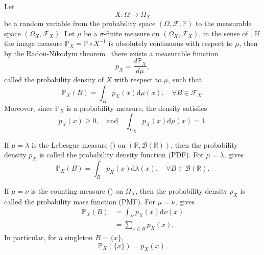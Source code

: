 \begin{definition}
	\label{def:prob_density_general}
	Let
	\begin{equation}
		X\colon \Omega \to \Omega_X
	\end{equation}
	be a random variable from the probability space $(\Omega, \mathcal{F}, \mathbb{P})$ to the measurable space $(\Omega_X, \mathcal{F}_X)$. Let $\mu$ be a $\sigma$-finite measure on $(\Omega_X, \mathcal{F}_X)$, in the sense of . If the image measure $\mathbb{P}_X = \mathbb{P} \circ X^{-1}$ is absolutely continuous with respect to $\mu$, then by the Radon-Nikodym theorem~\cite{Navratil1981} there exists a measurable function
	\begin{equation}
		p_X = \frac{d\mathbb{P}_X}{d\mu},
	\end{equation}
	called the probability density of $X$ with respect to $\mu$, such that
	\begin{equation}
		\mathbb{P}_X(B) = \int_B p_X(x) \mathrm{d}\mu(x), \quad \forall B \in \mathcal{F}_X.
	\end{equation}
	Moreover, since $\mathbb{P}_X$ is a probability measure, the density satisfies
	\begin{equation}
		p_X(x) \ge 0, \quad \text{and} \quad
		\int_{\Omega_X} p_X(x) \mathrm{d}\mu(x) = 1.
	\end{equation}
\end{definition}

\begin{remark}
	\label{remark:pdf}
	If $\mu = \lambda$ is the Lebesgue measure () on $(\mathbb{R}, \mathcal{B}(\mathbb{R}))$, then the probability density $p_X$ is called the probability density function (PDF). For $\mu = \lambda$,  gives
	\begin{equation}
		\mathbb{P}_X(B) = \int_B p_X(x) \mathrm{d}\lambda(x),
		\quad \forall B \in \mathcal{B}(\mathbb{R}).
	\end{equation}
\end{remark}

\begin{remark}
	\label{remark:pmf}
	If $\mu = \nu$ is the counting measure () on $\Omega_X$, then the probability density $p_X$ is called the probability mass function (PMF). For $\mu= \nu$,  gives
	\begin{equation}
		\begin{split}
			\mathbb{P}_X(B) &= \int_B p_X(x) \mathrm{d}\nu(x)\\ 
			&= \sum_{x \in B} p_X(x).
		\end{split}
	\end{equation}
	In particular, for a singleton $B = \{x\}$,
	\begin{equation}
		\mathbb{P}_X(\{x\}) = p_X(x).
	\end{equation}
\end{remark}

